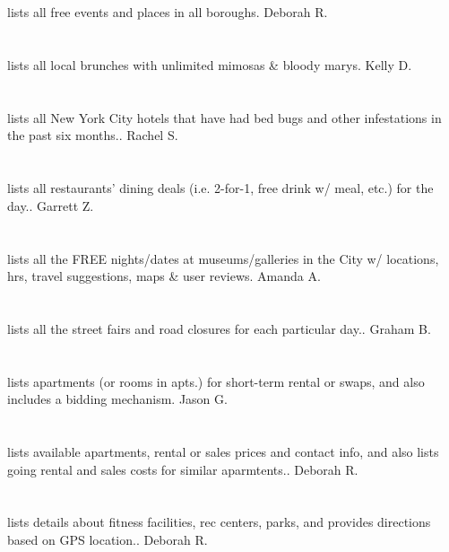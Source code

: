 \section{}lists all free events and places in all boroughs. Deborah R.
\section{}lists all local brunches with unlimited mimosas \& bloody marys. Kelly D.
\section{}lists all New York City hotels that have had bed bugs and other infestations in the past six months.. Rachel S.
\section{}lists all restaurants' dining deals (i.e. 2-for-1,  free drink w/ meal,  etc.) for the day.. Garrett Z.
\section{}lists all the FREE nights/dates at museums/galleries in the City w/ locations,  hrs,  travel suggestions,  maps \& user reviews. Amanda A.
\section{}lists all the street fairs and road closures for each particular day.. Graham B.
\section{}lists apartments (or rooms in apts.) for short-term rental or swaps,  and also includes a bidding mechanism. Jason G.
\section{}lists available apartments,  rental or sales prices and contact info,  and also lists going rental and sales costs for similar aparmtents.. Deborah R.
\section{}lists details about fitness facilities,  rec centers,  parks,  and provides directions based on GPS location.. Deborah R.
